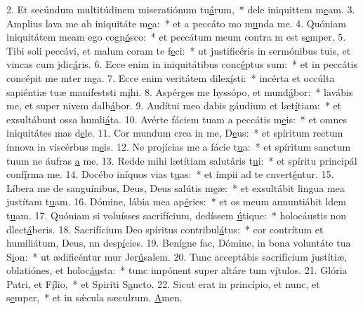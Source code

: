 2. Et secúndum multitúdinem miseratiónum tu\uline{á}rum,~* dele iniquittem m\uline{e}am.
3. Amplius lava me ab iniquitáte m\uline{e}a:~* et a peccáto mo m\uline{u}nda me.
4. Quóniam iniquitátem meam ego cogn\uline{ó}sco:~* et peccátum meum contra m est s\uline{e}mper.
5. Tibi soli peccávi, et malum coram te f\uline{e}ci:~* ut justificéris in sermónibus tuis, et vincas cum jdic\uline{á}ris.
6. Ecce enim in iniquitátibus conc\uline{é}ptus sum:~* et in peccátis concépit me mter m\uline{e}a.
7. Ecce enim veritátem dilex\uline{í}sti:~* incérta et occúlta sapiéntiæ tuæ manifeststi m\uline{i}hi.
8. Aspérges me hyssópo, et mund\uline{á}bor:~* lavábis me, et super nivem dalb\uline{á}bor.
9. Audítui meo dabis gáudium et læt\uline{í}tiam:~* et exsultábunt ossa humli\uline{á}ta.
10. Avérte fáciem tuam a peccátis m\uline{e}is:~* et omnes iniquitátes mas d\uline{e}le.
11. Cor mundum crea in me, D\uline{e}us:~* et spíritum rectum ínnova in viscérbus m\uline{e}is.
12. Ne projícias me a fácie t\uline{u}a:~* et spíritum sanctum tuum ne áufras \uline{a} me.
13. Redde mihi lætítiam salutáris t\uline{u}i:~* et spíritu principál conf\uline{í}rma me.
14. Docébo iníquos vias t\uline{u}as:~* et ímpii ad te cnvert\uline{é}ntur.
15. Líbera me de sanguínibus, Deus, Deus salútis m\uline{e}æ:~* et exsultábit lingua mea justítam t\uline{u}am.
16. Dómine, lábia mea ap\uline{é}ries:~* et os meum annuntiábit ldem t\uline{u}am.
17. Quóniam si voluísses sacrifícium, dedíssem \uline{ú}tique:~* holocáustis non dlect\uline{á}beris.
18. Sacrifícium Deo spíritus contribul\uline{á}tus:~* cor contrítum et humiliátum, Deus, nn desp\uline{í}cies.
19. Benígne fac, Dómine, in bona voluntáte tua S\uline{i}on:~* ut ædificéntur mur Jer\uline{ú}salem.
20. Tunc acceptábis sacrifícium justítiæ, oblatiónes, et holoc\uline{áu}sta:~* tunc impónent super altáre tum v\uline{í}tulos.
21. Glória Patri, et F\uline{í}lio,~* et Spiríti S\uline{a}ncto.
22. Sicut erat in princípio, et nunc, et s\uline{e}mper,~* et in sǽcula sæculrum. \uline{A}men.
